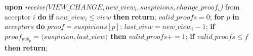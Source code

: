 \begin{algorithm}
\begin{algorithmic}[1]
		\State\textbf{upon} \textit{receive($VIEW\_CHANGE, new\_view_i, suspicions, change\_proof_i$)} from acceptor $i$ \textbf{do} 
		\State \hspace{\algorithmicindent} \textbf{if} $new\_view_i \leq view$ \textbf{then}
		\State \hspace{\algorithmicindent}\hspace{\algorithmicindent}\textbf{return};
		\State
		\State \hspace{\algorithmicindent} $valid\_proofs = 0$;
		\State \hspace{\algorithmicindent} \textbf{for} $p$ \textbf{in} $acceptors$ \textbf{do} 
		\State \hspace{\algorithmicindent}\hspace{\algorithmicindent} $proof = suspicions[p]$;
		\State \hspace{\algorithmicindent}\hspace{\algorithmicindent} $last\_view = new\_view_i-1$;
		\State \hspace{\algorithmicindent}\hspace{\algorithmicindent} \textbf{if} $proof_{pub_p} = \langle suspicion, last\_view \rangle$ \textbf{then}
		\State \hspace{\algorithmicindent}\hspace{\algorithmicindent}\hspace{\algorithmicindent} $valid\_proofs \mathrel{+{=}} 1$;
		\State
		\State \hspace{\algorithmicindent} \textbf{if} $valid\_proofs \leq f$ \textbf{then}
		\State \hspace{\algorithmicindent}\hspace{\algorithmicindent} \textbf{return};
		

\end{algorithmic}
\end{algorithm}
